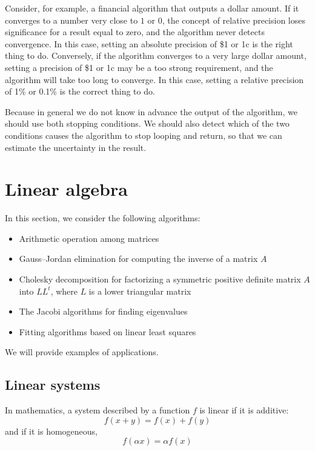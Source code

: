 \documentclass[justified,sixbynine]{tufte-book}
\theoremstyle{plain}%
\theoremstyle{definition}
\theoremstyle{remark}
\begin{document}
\begin{fullwidth}
Consider, for example, a financial algorithm that outputs a dollar amount. If it converges to a number very close to $1$ or $0$, the concept of relative precision loses significance for a result equal to zero, and the algorithm never detects convergence. In this case, setting an absolute precision of \$1 or 1c is the right thing to do. Conversely, if the algorithm converges to a very large dollar amount, setting a precision of \$1 or 1c may be a too strong requirement, and the algorithm will take too long to converge. In this case, setting a relative precision of 1\% or 0.1\% is the correct thing to do.

 Because in general we do not know in advance the output of the algorithm, we should use both stopping conditions. We should also detect which of the two conditions causes the algorithm to stop looping and return, so that we can estimate the uncertainty in the result.

\goodbreak\section{Linear algebra}


In this section, we consider the following algorithms:
\begin{itemize}
\item Arithmetic operation among matrices
\item Gauss--Jordan elimination for computing the inverse of a matrix $A$
\item Cholesky decomposition for factorizing a symmetric positive definite matrix $A$ into $L L^t$, where $L$ is a lower triangular matrix
\item The Jacobi algorithms for finding eigenvalues
\item Fitting algorithms based on linear least squares
\end{itemize}
We will provide examples of applications.

\goodbreak\subsection{Linear systems}

In mathematics, a system described by a function $f$ is linear if it is additive:
\begin{equation}
f(x+y) = f(x) + f(y)
\end{equation}
and if it is homogeneous,
\begin{equation}
f(\alpha x)  = \alpha f(x)
\end{equation}


\end{fullwidth}
\end{document}
